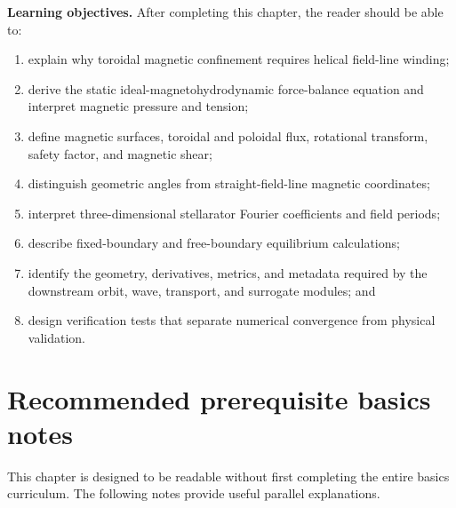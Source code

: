 \documentclass[11pt]{article}
\begin{document}
\begin{physicsbox}
\textbf{Learning objectives.} After completing this chapter, the reader should be able to:
\begin{enumerate}[leftmargin=1.6em]
\item explain why toroidal magnetic confinement requires helical field-line winding;
\item derive the static ideal-magnetohydrodynamic force-balance equation and interpret magnetic pressure and tension;
\item define magnetic surfaces, toroidal and poloidal flux, rotational transform, safety factor, and magnetic shear;
\item distinguish geometric angles from straight-field-line magnetic coordinates;
\item interpret three-dimensional stellarator Fourier coefficients and field periods;
\item describe fixed-boundary and free-boundary equilibrium calculations;
\item identify the geometry, derivatives, metrics, and metadata required by the downstream orbit, wave, transport, and surrogate modules; and
\item design verification tests that separate numerical convergence from physical validation.
\end{enumerate}
\end{physicsbox}

\section*{Recommended prerequisite basics notes}
This chapter is designed to be readable without first completing the entire basics curriculum. The following notes provide useful parallel explanations.
\end{document}
